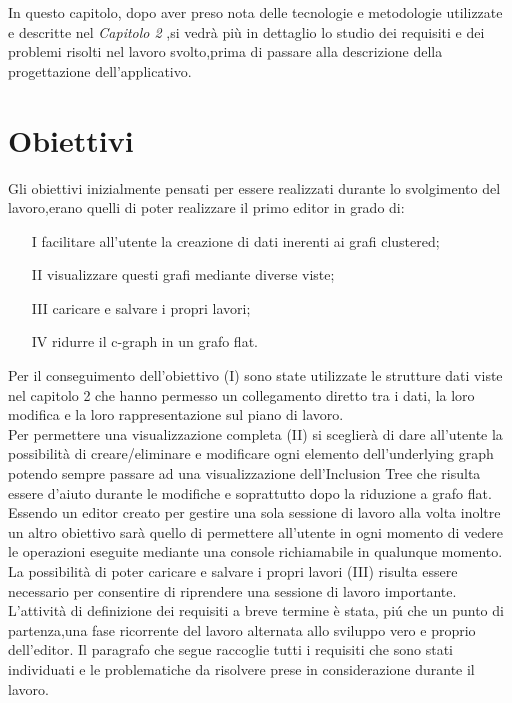 \large{
In questo capitolo, dopo aver preso nota delle tecnologie e metodologie utilizzate e descritte nel \textit{Capitolo 2} ,si vedrà più in dettaglio lo studio dei requisiti e dei problemi risolti nel lavoro svolto,prima di passare alla descrizione della progettazione dell'applicativo.

\section{Obiettivi}
Gli obiettivi inizialmente pensati per essere realizzati durante lo svolgimento del lavoro,erano quelli di poter realizzare il primo editor in grado di:
\begin{itemize}
	\item[I]facilitare all'utente la creazione di dati inerenti ai grafi clustered;
	\item[II] visualizzare questi grafi mediante diverse viste;
	\item[III]caricare e salvare i propri lavori;
	\item[IV] ridurre il c-graph in un grafo flat.
\end{itemize}
Per il conseguimento dell'obiettivo (I) sono state utilizzate le strutture dati viste nel capitolo 2 che hanno permesso un collegamento diretto tra i dati, la loro modifica e la loro rappresentazione sul piano di lavoro.\\
Per permettere una visualizzazione completa (II) si sceglierà di dare all'utente la possibilità di creare/eliminare e modificare ogni elemento dell'underlying graph potendo sempre passare ad una visualizzazione dell'Inclusion Tree che risulta essere d'aiuto durante le modifiche e soprattutto dopo la riduzione a grafo flat. Essendo un editor creato per gestire una sola sessione di lavoro alla volta inoltre un altro obiettivo sarà quello di permettere all'utente in ogni momento di vedere le operazioni eseguite mediante una console richiamabile in qualunque momento.\\
La possibilità di poter caricare e salvare i propri lavori (III) risulta essere necessario per consentire di riprendere una sessione di lavoro importante.\\
L’attività di definizione dei requisiti a breve termine \`e stata, pi\'u che un punto di partenza,una fase ricorrente del lavoro alternata allo sviluppo vero e proprio dell'editor. Il paragrafo che segue raccoglie tutti i requisiti che sono stati individuati e le problematiche da risolvere prese in considerazione durante il lavoro.

}
